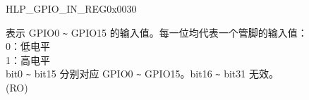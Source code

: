 \begin{register}{H}{LP\_GPIO\_IN\_REG}{0x0030}\label{regdesc:LPGPIOINREG}
%
%
\regnewline%
\begin{regdesc}\begin{reglist}
\label{fielddesc:LPGPIOINDATANEXT}\item [LP\_GPIO\_IN\_DATA\_NEXT]  表示 GPIO0 \verb+~+ GPIO15 的输入值。每一位均代表一个管脚的输入值：\\
0：低电平\\
1：高电平\\
bit0 \verb+~+ bit15 分别对应 GPIO0 \verb+~+ GPIO15。bit16 \verb+~+ bit31 无效。\\
(RO)
\end{reglist}\end{regdesc}
\end{register}


